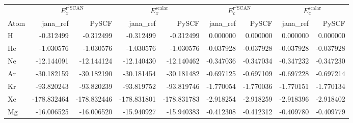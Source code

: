 \begin{tabular}{@{}lrrrrrrrr@{}}
\toprule
 & \multicolumn{2}{c}{$E_x^{\mathrm{r^2SCAN}}$} & \multicolumn{2}{c}{$E_x^{\mathrm{scalar}}$} & \multicolumn{2}{c}{$E_c^{\mathrm{r^2SCAN}}$} & \multicolumn{2}{c}{$E_c^{\mathrm{scalar}}$} \\
\cmidrule(lr){2-3}\cmidrule(lr){4-5}\cmidrule(lr){6-7}\cmidrule(lr){8-9}
Atom & jana\_ref & PySCF & jana\_ref & PySCF & jana\_ref & PySCF & jana\_ref & PySCF \\
\midrule
H & -0.312499 & \textcolor{pyscfred}{-0.312499} & -0.312499 & \textcolor{pyscfred}{-0.312499} & 0.000000 & \textcolor{pyscfred}{0.000000} & 0.000000 & \textcolor{pyscfred}{0.000000} \\
He & -1.030576 & \textcolor{pyscfred}{-1.030576} & -1.030576 & \textcolor{pyscfred}{-1.030576} & -0.037928 & \textcolor{pyscfred}{-0.037928} & -0.037928 & \textcolor{pyscfred}{-0.037928} \\
Ne & -12.144091 & \textcolor{pyscfred}{-12.144124} & -12.140430 & \textcolor{pyscfred}{-12.140462} & -0.347036 & \textcolor{pyscfred}{-0.347034} & -0.347232 & \textcolor{pyscfred}{-0.347230} \\
Ar & -30.182159 & \textcolor{pyscfred}{-30.182190} & -30.181454 & \textcolor{pyscfred}{-30.181482} & -0.697125 & \textcolor{pyscfred}{-0.697109} & -0.697228 & \textcolor{pyscfred}{-0.697214} \\
Kr & -93.820243 & \textcolor{pyscfred}{-93.820239} & -93.819752 & \textcolor{pyscfred}{-93.819746} & -1.770054 & \textcolor{pyscfred}{-1.770036} & -1.770151 & \textcolor{pyscfred}{-1.770134} \\
Xe & -178.832464 & \textcolor{pyscfred}{-178.832446} & -178.831801 & \textcolor{pyscfred}{-178.831783} & -2.918254 & \textcolor{pyscfred}{-2.918259} & -2.918396 & \textcolor{pyscfred}{-2.918402} \\
Mg & -16.006525 & \textcolor{pyscfred}{-16.006520} & -15.940927 & \textcolor{pyscfred}{-15.940383} & -0.412308 & \textcolor{pyscfred}{-0.412312} & -0.409780 & \textcolor{pyscfred}{-0.409779} \\
\bottomrule
\end{tabular}
